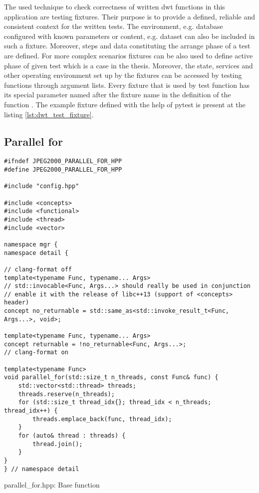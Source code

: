 The used technique to check correctness of written dwt functions in this application are testing
fixtures. Their purpose is to provide a defined, reliable and consistent context for the written tests.
The environment, e.g. database configured with known parameters or content, e.g. dataset can also
be included in such a fixture. Moreover, steps and data constituting the arrange phase of a test
are defined. For more complex scenarios fixtures can be also used to define active phase 
of given test which is a case in the thesis. Moreover, the state, services and other operating
environment set up by the fixtures can be accessed by testing functions through argument lists.
Every fixture that is used by test function has its special parameter named after the fixture name
in the definition of the function \cite{pytest}. The example fixture defined with the help
of pytest is present at the listing \ref{lst:dwt_test_fixture}.

\subsection{Parallel for}

\begin{listing}[htb]
\begin{verbatim}
#ifndef JPEG2000_PARALLEL_FOR_HPP
#define JPEG2000_PARALLEL_FOR_HPP

#include "config.hpp"

#include <concepts>
#include <functional>
#include <thread>
#include <vector>

namespace mgr {
namespace detail {

// clang-format off
template<typename Func, typename... Args>
// std::invocable<Func, Args...> should really be used in conjunction
// enable it with the release of libc++13 (support of <concepts> header)
concept no_returnable = std::same_as<std::invoke_result_t<Func, Args...>, void>;

template<typename Func, typename... Args>
concept returnable = !no_returnable<Func, Args...>;
// clang-format on

template<typename Func>
void parallel_for(std::size_t n_threads, const Func& func) {
    std::vector<std::thread> threads;
    threads.reserve(n_threads);
    for (std::size_t thread_idx{}; thread_idx < n_threads; thread_idx++) {
        threads.emplace_back(func, thread_idx);
    }
    for (auto& thread : threads) {
        thread.join();
    }
}
} // namespace detail
\end{verbatim}
\caption{parallel\_for.hpp: Base function}
\label{lst:parallel_for_base_function}
\end{listing}


